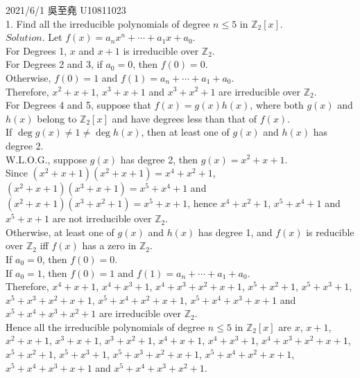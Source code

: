\documentclass[12pt]{book}
\author{andersonwu2000}
\begin{document}
\begin{CJK}{UTF8}{bsmi}

\hfill 2021/6/1 吳至堯 U10811023 \\

1. Find all the irreducible polynomials of degree $n\le5$ in $\mathbb{Z}_2[x]$. \\
$Solution$. Let $f(x) = a_n x^n + \cdots + a_1 x + a_0$. \\
For Degrees 1, $x$ and $x+1$ is irreducible over $\mathbb{Z}_2$. \\

For Degrees 2 and 3, if $a_0=0$, then $f(0)=0$. \\
Otherwise, $f(0)=1$ and $f(1)=a_n + \cdots + a_1 + a_0$. \\
Therefore, $x^2+x+1$, $x^3+x+1$ and $x^3+x^2+1$ are irreducible over $\mathbb{Z}_2$. \\

For Degrees 4 and 5, suppose that $f(x)=g(x)h(x)$, where both $g(x)$ and $h(x)$ belong to $\mathbb{Z}_2[x]$ and have degrees less than that of $f(x)$. \\
If $\deg g(x)\ne1\ne\deg h(x)$, then at least one of $g(x)$ and $h(x)$ has degree 2. \\
W.L.O.G., suppose $g(x)$ has degree 2, then $g(x)=x^2+x+1$. \\
Since $(x^2+x+1)(x^2+x+1)=x^4+x^2+1$, $(x^2+x+1)(x^3+x+1)=x^5+x^4+1$ and $(x^2+x+1)(x^3+x^2+1)=x^5+x+1$, hence $x^4+x^2+1$, $x^5+x^4+1$ and $x^5+x+1$ are not irreducible over $\mathbb{Z}_2$. \\
Otherwise, at least one of $g(x)$ and $h(x)$ has degree 1, and $f(x)$ is reducible over $\mathbb{Z}_2$ iff $f(x)$ has a zero in $\mathbb{Z}_2$. \\
If $a_0=0$, then $f(0)=0$. \\
If $a_0=1$, then $f(0)=1$ and $f(1)=a_n + \cdots + a_1 + a_0$. \\
Therefore, $x^4+x+1$, $x^4+x^3+1$, $x^4+x^3+x^2+x+1$, $x^5+x^2+1$, $x^5+x^3+1$, $x^5+x^3+x^2+x+1$, $x^5+x^4+x^2+x+1$, $x^5+x^4+x^3+x+1$ and $x^5+x^4+x^3+x^2+1$ are irreducible over $\mathbb{Z}_2$. \\

Hence all the irreducible polynomials of degree $n\le5$ in $\mathbb{Z}_2[x]$ are $x$, $x+1$, $x^2+x+1$, $x^3+x+1$, $x^3+x^2+1$, $x^4+x+1$, $x^4+x^3+1$, $x^4+x^3+x^2+x+1$, $x^5+x^2+1$, $x^5+x^3+1$, $x^5+x^3+x^2+x+1$, $x^5+x^4+x^2+x+1$, $x^5+x^4+x^3+x+1$ and $x^5+x^4+x^3+x^2+1$. \\


\end{CJK}
\end{document}
